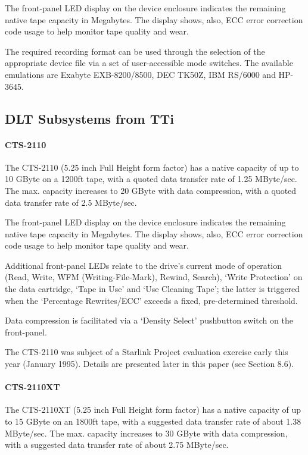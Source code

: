\documentclass[11pt]{article}
\begin{document}
The front-panel LED display on the device enclosure indicates the remaining
native tape capacity in Megabytes. The display shows, also, ECC error
correction code usage to help monitor tape quality and wear.

The required recording format can be used through the selection of the
appropriate device file via a set of user-accessible mode switches. The
available emulations are Exabyte EXB-8200/8500, DEC TK50Z, IBM RS/6000 and
HP-3645.

\subsection {DLT Subsystems from TTi}

\paragraph {CTS-2110}

The CTS-2110 (5.25 inch Full Height form factor) has a native capacity of up
to 10 GByte on a 1200ft tape, with a quoted data transfer rate of 1.25
MByte/sec. The max. capacity increases to 20 GByte with data compression, with a
quoted data transfer rate of 2.5 MByte/sec.

The front-panel LED display on the device enclosure indicates the remaining
native tape capacity in Megabytes. The display shows, also, ECC error
correction code usage to help monitor tape quality and wear.

Additional front-panel LEDs relate to the drive's current mode of operation
(Read, Write, WFM (Writing-File-Mark), Rewind, Search), `Write Protection' on
the data cartridge, `Tape in Use' and `Use Cleaning Tape'; the latter is
triggered when the `Percentage Rewrites/ECC' exceeds a fixed, pre-determined
threshold.

Data compression is facilitated via a `Density Select' pushbutton switch on the
front-panel.

The CTS-2110 was subject of a Starlink Project evaluation exercise early
this year (January 1995). Details are presented later in this paper (see
Section 8.6).

\paragraph {CTS-2110XT}

The CTS-2110XT (5.25 inch Full Height form factor) has a native capacity of
up to 15 GByte on an 1800ft tape, with a suggested data transfer rate of about
1.38 MByte/sec. The max. capacity increases to 30 GByte with data compression,
with a suggested data transfer rate of about 2.75 MByte/sec.
\end{document}
